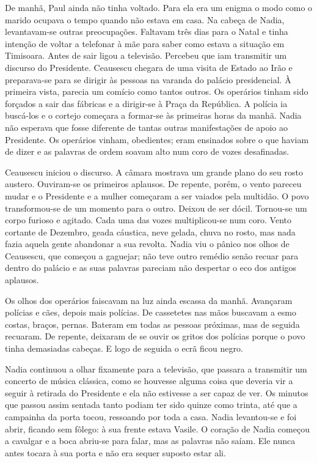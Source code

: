 De manhã, Paul ainda não tinha voltado. Para ela era um enigma o modo
como o marido ocupava o tempo quando não estava em casa. Na cabeça de
Nadia, levantavam-se outras preocupações. Faltavam três dias para o
Natal e tinha intenção de voltar a telefonar à mãe para saber como
estava a situação em Timisoara. Antes de sair ligou a televisão.
Percebeu que iam transmitir um discurso do Presidente. Ceausescu chegara
de uma visita de Estado ao Irão e preparava-se para se dirigir às
pessoas na varanda do palácio presidencial. À primeira vista, parecia um
comício como tantos outros. Os operários tinham sido forçados a sair
das fábricas e a dirigir-se à Praça da República. A polícia ia buscá-los
e o cortejo começara a formar-se às primeiras horas da manhã. Nadia não
esperava que fosse diferente de tantas outras manifestações de apoio ao
Presidente. Os operários vinham, obedientes; eram ensinados sobre o
que haviam de dizer e as palavras de ordem soavam alto num coro de
vozes desafinadas.

Ceausescu iniciou o discurso. A câmara mostrava um
grande plano do seu rosto austero. Ouviram-se os primeiros aplausos.
De repente, porém, o vento pareceu mudar e o Presidente e a mulher
começaram a ser vaiados pela multidão. O povo transformou-se de um
momento para o outro. Deixou de ser dócil. Tornou-se um corpo furioso e
agitado. Cada uma das vozes multiplicou-se num coro. Vento cortante de
Dezembro, geada cáustica, neve gelada, chuva no rosto, mas nada fazia
aquela gente abandonar a sua revolta. Nadia viu o pânico nos olhos de
Ceausescu,
que começou a gaguejar; não teve outro remédio senão recuar para dentro
do palácio e as suas palavras pareciam não despertar o eco dos antigos
aplausos.

Os olhos dos operários faiscavam na luz ainda escassa da manhã.
Avançaram polícias e cães, depois mais polícias. De cassetetes nas mãos
buscavam a esmo costas, braços, pernas. Bateram em todas as pessoas
próximas, mas de seguida recuaram. De repente, deixaram de se ouvir os
gritos dos polícias porque o povo tinha demasiadas cabeças. E logo de
seguida o ecrã ficou negro.

Nadia continuou a olhar fixamente para a televisão, que passara a
transmitir um concerto de música clássica, como se houvesse alguma coisa
que deveria vir a seguir à retirada do Presidente e ela não estivesse a
ser capaz de ver. Os minutos que passou assim sentada tanto podiam ter
sido quinze como trinta, até que a campainha da porta tocou, ressoando
por toda a casa. Nadia levantou-se e foi abrir, ficando sem fôlego: à sua frente estava Vasile. O
coração de Nadia começou a cavalgar e a boca abriu-se para falar, mas as
palavras não saíam. Ele nunca antes tocara à sua porta e não era sequer
suposto estar ali.

